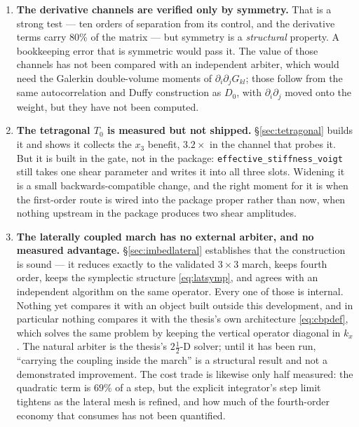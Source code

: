 \documentclass[11pt,a4paper]{article}
\begin{document}
\begin{enumerate}
{      Galerkin one.}  In the Galerkin pairing the transferred derivative lands
      on polynomials, so the third-derivative moment cannot arise; under
      collocation it transfers onto $\boldsymbol\Gamma$ and can.  Do not quote
      the Galerkin count for a collocation build.  \eqref{eq:ikrule} is how that
      transfer is carried out in practice, and it is verified; what is not yet
      done is the count itself.
\item \textbf{The derivative channels are verified only by symmetry.}  That is a
      strong test --- ten orders of separation from its control, and the
      derivative terms carry $80\%$ of the matrix --- but symmetry is a
      \emph{structural} property.  A bookkeeping error that is symmetric would
      pass it.  The value of those channels has not been compared with an
      independent arbiter, which would need the Galerkin double-volume moments of
      $\partial_i\partial_j G_{kl}$; those follow from the same autocorrelation
      and Duffy construction as $D_0$, with $\partial_i\partial_j$ moved onto the
      weight, but they have not been computed.
\item \textbf{The tetragonal $T_0$ is measured but not shipped.}
      \S\ref{sec:tetragonal} builds it and shows it collects the $x_3$ benefit,
      $3.2\times$ in the channel that probes it.  But it is built in the gate,
      not in the package: \texttt{effective\_stiffness\_voigt} still takes one
      shear parameter and writes it into all three slots.  Widening it is a small
      backwards-compatible change, and the right moment for it is when the
      first-order route is wired into the package proper rather than now, when
      nothing upstream in the package produces two shear amplitudes.
\item \textbf{The laterally coupled march has no external arbiter, and no
      measured advantage.}  \S\ref{sec:imbedlateral} establishes that the
      construction is sound --- it reduces exactly to the validated
      $3\times3$ march, keeps fourth order, keeps the symplectic structure
      \eqref{eq:latsymp}, and agrees with an independent algorithm on the same
      operator.  Every one of those is internal.  Nothing yet compares it with
      an object built outside this development, and in particular nothing
      compares it with the thesis's own architecture \eqref{eq:cbpdef}, which
      solves the same problem by keeping the vertical operator diagonal in
      $k_x$.  The natural arbiter is the thesis's $2\tfrac12$-D solver; until it
      has been run, ``carrying the coupling inside the march'' is a structural
      result and not a demonstrated improvement.  The cost trade is likewise
      only half measured: the quadratic term is $69\%$ of a step, but the
      explicit integrator's step limit tightens as the lateral mesh is refined,
      and how much of the fourth-order economy that consumes has not been
      quantified.
\end{enumerate}
\end{document}
